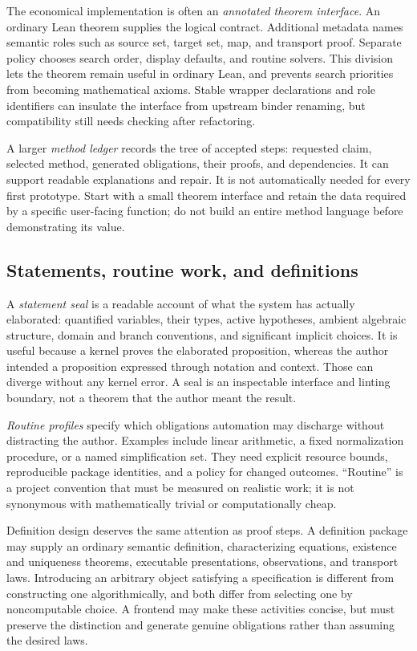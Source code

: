 \documentclass[11pt,letterpaper]{article}
\begin{document}
The economical implementation is often an \emph{annotated theorem interface}.
An ordinary Lean theorem supplies the logical contract. Additional metadata
names semantic roles such as source set, target set, map, and transport proof.
Separate policy chooses search order, display defaults, and routine solvers.
This division lets the theorem remain useful in ordinary Lean, and prevents
search priorities from becoming mathematical axioms. Stable wrapper declarations
and role identifiers can insulate the interface from upstream binder renaming,
but compatibility still needs checking after refactoring.

A larger \emph{method ledger} records the tree of accepted steps: requested
claim, selected method, generated obligations, their proofs, and dependencies.
It can support readable explanations and repair. It is not automatically needed
for every first prototype. Start with a small theorem interface and retain the
data required by a specific user-facing function; do not build an entire method
language before demonstrating its value.

\subsection{Statements, routine work, and definitions}
A \emph{statement seal} is a readable account of what the system has actually
elaborated: quantified variables, their types, active hypotheses, ambient
algebraic structure, domain and branch conventions, and significant implicit
choices. It is useful because a kernel proves the elaborated proposition,
whereas the author intended a proposition expressed through notation and
context. Those can diverge without any kernel error. A seal is an inspectable
interface and linting boundary, not a theorem that the author meant the result.

\emph{Routine profiles} specify which obligations automation may discharge
without distracting the author. Examples include linear arithmetic, a fixed
normalization procedure, or a named simplification set. They need explicit
resource bounds, reproducible package identities, and a policy for changed
outcomes. ``Routine'' is a project convention that must be measured on realistic
work; it is not synonymous with mathematically trivial or computationally cheap.

Definition design deserves the same attention as proof steps. A definition
package may supply an ordinary semantic definition, characterizing equations,
existence and uniqueness theorems, executable presentations, observations, and
transport laws. Introducing an arbitrary object satisfying a specification is
different from constructing one algorithmically, and both differ from selecting
one by noncomputable choice. A frontend may make these activities concise, but
must preserve the distinction and generate genuine obligations rather than
assuming the desired laws.
\end{document}
